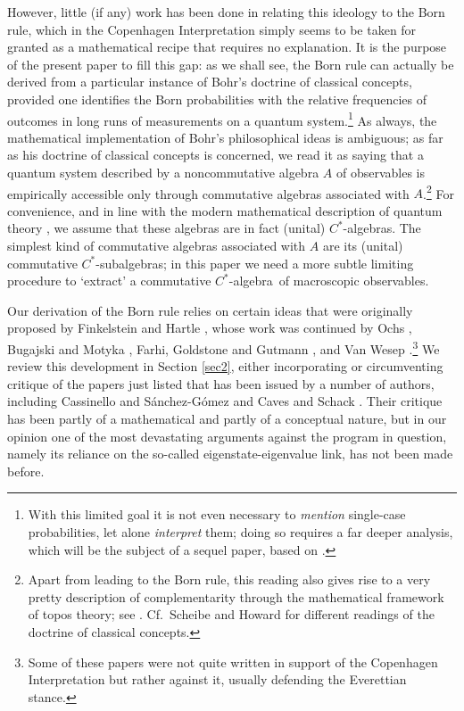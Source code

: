 \documentclass[12pt]{article}
\newcommand{\ca}{$C^*$-algebra} \newcommand{\jba}{JB-algebra}
\begin{document}
However, little (if any) work has been done in relating this ideology to the Born rule, which in the Copenhagen Interpretation simply seems to be taken for granted as a mathematical recipe that requires no explanation. It is the purpose of the present paper to fill this gap: as we shall see, the Born rule can actually be derived from a particular instance of Bohr's doctrine of classical concepts, provided one identifies the Born probabilities with the relative frequencies of  outcomes in long runs of measurements on a quantum system.\footnote{With this limited goal it is not even necessary to \emph{mention} single-case probabilities, let alone \emph{interpret} them; doing so requires a far deeper analysis, which will be the subject of a sequel paper, based on  \cite{HLS1}.} As always, the mathematical implementation of Bohr's philosophical ideas is ambiguous; as far as his doctrine of classical concepts is concerned,
we read it as saying that  a quantum system described by a noncommutative algebra $A$ of observables  is empirically accessible only through commutative algebras associated with $A$.\footnote{Apart from leading to the Born rule, this reading also gives rise to a very pretty description of complementarity through the mathematical framework of topos theory; see \cite{HLS1}. Cf.\  Scheibe \cite{24} and Howard  \cite{How} for different readings of the doctrine of classical concepts.} 
For convenience, and in line with the modern mathematical description of quantum theory 
\cite{T4,BR2,Haag,Sewell,book,handbook}, we assume that these algebras are in fact (unital) \ca s. The simplest kind of commutative algebras associated with $A$ are its (unital) commutative
 $C^*$-subalgebras; in this paper we need a more subtle limiting procedure to `extract' a
 commutative \ca\ of macroscopic observables.

Our derivation of the Born rule relies on certain ideas that were originally proposed by  Finkelstein \cite{16} and Hartle \cite{19}, whose work was continued by Ochs \cite{ochs},
Bugajski and Motyka \cite{BM}, Farhi, Goldstone and Gutmann \cite{14}, and Van Wesep \cite{vW}.\footnote{Some of these papers were not quite written in support of the  Copenhagen Interpretation but rather against it, usually defending the Everettian stance.}
We review this development in Section \ref{sec2}, either incorporating or circumventing  critique of  the papers just listed  that has been issued 
  by a number of authors, including
 Cassinello and  S\'{a}nchez-G\'{o}mez \cite{11} and Caves and Schack \cite{12}. Their critique has been partly of a mathematical and partly of a conceptual nature, but in our opinion one of the most devastating arguments against the program in question, namely its reliance on the so-called eigenstate-eigenvalue link, has not been made before.   
 
\end{document}
